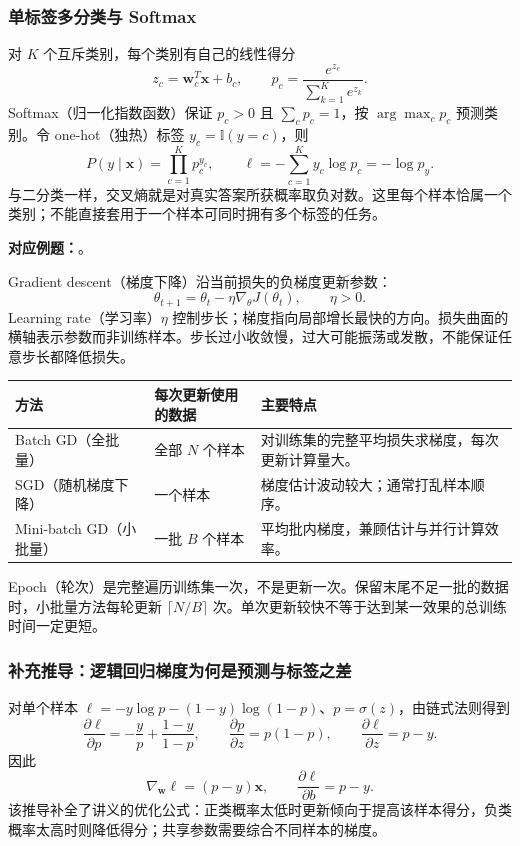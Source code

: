 \subsubsection{单标签多分类与 Softmax}

对 $K$ 个互斥类别，每个类别有自己的线性得分
\[
  z_c=\mathbf w_c^T\mathbf x+b_c,
  \qquad
  p_c=\frac{e^{z_c}}{\sum_{k=1}^K e^{z_k}}.
\]
Softmax（归一化指数函数）保证 $p_c>0$ 且 $\sum_c p_c=1$，按 $\arg\max_c p_c$ 预测类别。令 one-hot（独热）标签 $y_c=\mathbb I(y=c)$，则
\[
  P(y\mid\mathbf x)=\prod_{c=1}^K p_c^{y_c},
  \qquad
  \ell=-\sum_{c=1}^K y_c\log p_c=-\log p_y.
\]
与二分类一样，交叉熵就是对真实答案所获概率取负对数。这里每个样本恰属一个类别；不能直接套用于一个样本可同时拥有多个标签的任务。

\textbf{对应例题：}。


Gradient descent（梯度下降）沿当前损失的负梯度更新参数：
\[
  \theta_{t+1}=\theta_t-\eta\nabla_\theta J(\theta_t),
  \qquad \eta>0.
\]
Learning rate（学习率）$\eta$ 控制步长；梯度指向局部增长最快的方向。损失曲面的横轴表示参数而非训练样本。步长过小收敛慢，过大可能振荡或发散，不能保证任意步长都降低损失。

\begin{center}
\small
\begin{tabularx}{\textwidth}{@{}l X X@{}}
\toprule
方法 & 每次更新使用的数据 & 主要特点 \\
\midrule
Batch GD（全批量） & 全部 $N$ 个样本 & 对训练集的完整平均损失求梯度，每次更新计算量大。\\
SGD（随机梯度下降） & 一个样本 & 梯度估计波动较大；通常打乱样本顺序。\\
Mini-batch GD（小批量） & 一批 $B$ 个样本 & 平均批内梯度，兼顾估计与并行计算效率。\\
\bottomrule
\end{tabularx}
\end{center}

Epoch（轮次）是完整遍历训练集一次，不是更新一次。保留末尾不足一批的数据时，小批量方法每轮更新 $\lceil N/B\rceil$ 次。单次更新较快不等于达到某一效果的总训练时间一定更短。

\subsubsection{补充推导：逻辑回归梯度为何是预测与标签之差}

对单个样本 $\ell=-y\log p-(1-y)\log(1-p)$、$p=\sigma(z)$，由链式法则得到
\[
  \frac{\partial\ell}{\partial p}=-\frac yp+\frac{1-y}{1-p},
  \qquad
  \frac{\partial p}{\partial z}=p(1-p),
  \qquad
  \frac{\partial\ell}{\partial z}=p-y.
\]
因此
\[
  \nabla_{\mathbf w}\ell=(p-y)\mathbf x,
  \qquad \frac{\partial\ell}{\partial b}=p-y.
\]
该推导补全了讲义的优化公式：正类概率太低时更新倾向于提高该样本得分，负类概率太高时则降低得分；共享参数需要综合不同样本的梯度。

